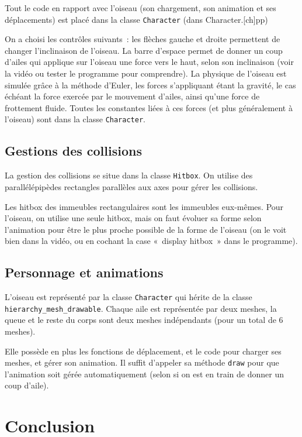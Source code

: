 \documentclass[a4paper,12pt]{article}
\begin{document}
Tout le code en rapport avec l’oiseau (son chargement, son animation et ses déplacements) est placé dans la classe \verb|Character| (dans Character.[ch]pp)

On a choisi les contrôles suivants : les flèches gauche et droite permettent de changer l’inclinaison de l’oiseau. La barre d’espace permet de donner un coup d’ailes qui applique sur l’oiseau une force vers le haut, selon son inclinaison (voir la vidéo ou tester le programme pour comprendre).
La physique de l’oiseau est simulée grâce à la méthode d’Euler, les forces s’appliquant étant la gravité, le cas échéant la force exercée par le mouvement d’ailes, ainsi qu’une force de frottement fluide.
Toutes les constantes liées à ces forces (et plus généralement à l’oiseau) sont dans la classe \verb|Character|.


\subsection{Gestions des collisions}

La gestion des collisions se situe dans la classe \verb|Hitbox|. On utilise des parallélépipèdes rectangles parallèles 
aux axes pour gérer les collisions.

Les hitbox des immeubles rectangulaires sont les immeubles eux-mêmes. 
Pour l’oiseau, on utilise une seule hitbox, mais on faut évoluer sa forme selon l’animation pour être le plus proche possible de la forme de l’oiseau 
(on le voit bien dans la vidéo, ou en cochant la case « display hitbox » dans le programme).

\subsection{Personnage et animations}

L’oiseau est représenté par la classe \verb|Character| qui hérite de la classe \verb|hierarchy_mesh_drawable|.
Chaque aile est représentée par deux meshes, la queue et le reste du corps sont deux meshes indépendants (pour un total de 6 meshes).

Elle possède en plus les fonctions de déplacement, et le code pour charger ses meshes, et gérer son animation.
Il suffit d’appeler sa méthode \verb|draw| pour que l’animation soit gérée automatiquement (selon si on est en train de donner un coup d’aile).

\section{Conclusion}
\end{document}
